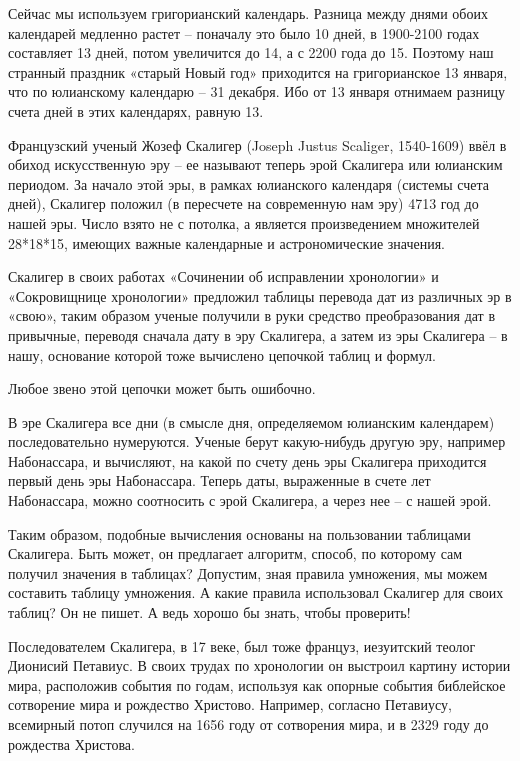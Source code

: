 Сейчас мы используем григорианский календарь. Разница между днями обоих календарей медленно растет – поначалу это было 10 дней, в 1900-2100 годах составляет 13 дней, потом увеличится до 14, а с 2200 года до 15. Поэтому наш странный праздник «старый Новый год» приходится на григорианское 13 января, что по юлианскому календарю – 31 декабря. Ибо от 13 января отнимаем разницу счета дней в этих календарях, равную 13.

Французский ученый Жозеф Скалигер (Joseph Justus Scali\-ger, 1540-1609) ввёл в обиход искусственную эру – ее называют теперь эрой Скалигера или юлианским периодом. За начало этой эры, в рамках юлианского календаря (системы счета дней), Скалигер положил (в пересчете на современную нам эру) 4713 год до нашей эры. Число взято не с потолка, а является произведением множителей 28*18*15, имеющих важные календарные и астрономические значения.

Скалигер в своих работах «Сочинении об исправлении хронологии» и «Сокровищнице хронологии» предложил таблицы перевода дат из различных эр в «свою», таким образом ученые получили в руки средство преобразования дат в привычные, переводя сначала дату в эру Скалигера, а затем из эры Скалигера – в нашу, основание которой тоже вычислено цепочкой таблиц и формул. 

Любое звено этой цепочки может быть ошибочно.

В эре Скалигера все дни (в смысле дня, определяемом юлианским календарем) последовательно нумеруются. Ученые берут какую-нибудь другую эру, например Набонассара, и вычисляют, на какой по счету день эры Скалигера приходится первый день эры Набонассара. Теперь даты, выраженные в счете лет Набонассара, можно соотносить с эрой Скалигера, а через нее – с нашей эрой.

Таким образом, подобные вычисления основаны на пользовании таблицами Скалигера. Быть может, он предлагает алгоритм, способ, по которому сам получил значения в таблицах? Допустим, зная правила умножения, мы можем составить таблицу умножения. А какие правила использовал Скалигер для своих таблиц? Он не пишет. А ведь хорошо бы знать, чтобы проверить!

Последователем Скалигера, в 17 веке, был тоже француз, иезуитский теолог Дионисий Петавиус. В своих трудах по хронологии он выстроил картину истории мира, расположив события по годам, используя как опорные события библейское сотворение мира и рождество Христово. Например, согласно Петавиусу, всемирный потоп случился на 1656 году от сотворения мира, и в 2329 году до рождества Христова.

